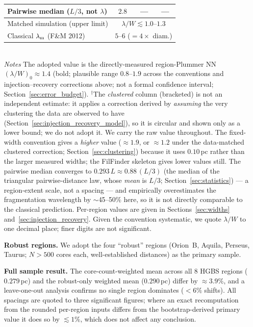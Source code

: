 \documentclass[usenatbib,twoside,twocolumn]{mnras}
\begin{document}
\begin{table}
\begin{tabular}{p{3.6cm}ccc}
Pairwise median ($L/3$, not $\lambda$) & $2.8$ & --- & --- \\
\midrule
Matched simulation (upper limit) & \multicolumn{3}{c}{$\lambda/W\lesssim1.0$--$1.3$} \\
Classical $\lambda_{\rm m}$ (F\&M 2012) & \multicolumn{3}{c}{$5$--$6$ ($=4\times$ diam.)} \\
\bottomrule
\end{tabular}
\\[2pt]
\footnotesize
\emph{Notes} The adopted value is the directly-measured region-Plummer NN $(\lambda/W)_0\approx1.4$ (bold; plausible range $0.8$--$1.9$ across the conventions and injection--recovery corrections above; not a formal confidence interval; Section~\ref{sec:error_budget}). $^{\dagger}$The \emph{clustered} column (bracketed) is not an independent estimate: it applies a correction derived by \emph{assuming} the very clustering the data are observed to have (Section~\ref{sec:injection_recovery_model}), so it is circular and shown only as a lower bound; we do not adopt it. We carry the raw value throughout. The fixed-width convention gives a \emph{higher} value ($\approx1.9$, or $\approx1.2$ under the data-matched clustered correction; Section~\ref{sec:clustering}) because it uses $0.10$\,pc rather than the larger measured widths; the FilFinder skeleton gives lower values still. The pairwise median converges to $0.293\,L\approx0.88\,(L/3)$ (the median of the triangular pairwise-distance law, whose \emph{mean} is $L/3$; Section~\ref{sec:statistics}) --- a region-extent scale, not a spacing --- and empirically overestimates the fragmentation wavelength by $\sim$45--50\% here, so it is not directly comparable to the classical prediction. Per-region values are given in Sections~\ref{sec:widths} and~\ref{sec:injection_recovery}. Given the convention systematic, we quote $\lambda/W$ to one decimal place; finer digits are not significant.
\end{table}

\textbf{Robust regions.} We adopt the four ``robust'' regions (Orion~B, Aquila, Perseus, Taurus; $N>500$ cores each, well-established distances) as the primary sample.

\textbf{Full sample result.} The core-count-weighted mean across all 8 HGBS regions ($0.279$\,pc) and the robust-only weighted mean ($0.290$\,pc) differ by $\approx3.9\%$, and a leave-one-out analysis confirms no single region dominates ($<6\%$ shifts). All spacings are quoted to three significant figures; where an exact recomputation from the rounded per-region inputs differs from the bootstrap-derived primary value it does so by $\lesssim1\%$, which does not affect any conclusion.
\end{document}
